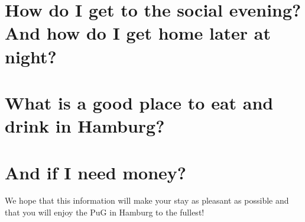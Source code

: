 \section*{How do I get to the social evening? And how do I get home later at night?}







\section*{What is a good place to eat and drink in Hamburg?}



\section*{And if I need money?}




We hope that this information will make your stay as pleasant as possible and that you will enjoy the PuG in Hamburg to the fullest!


